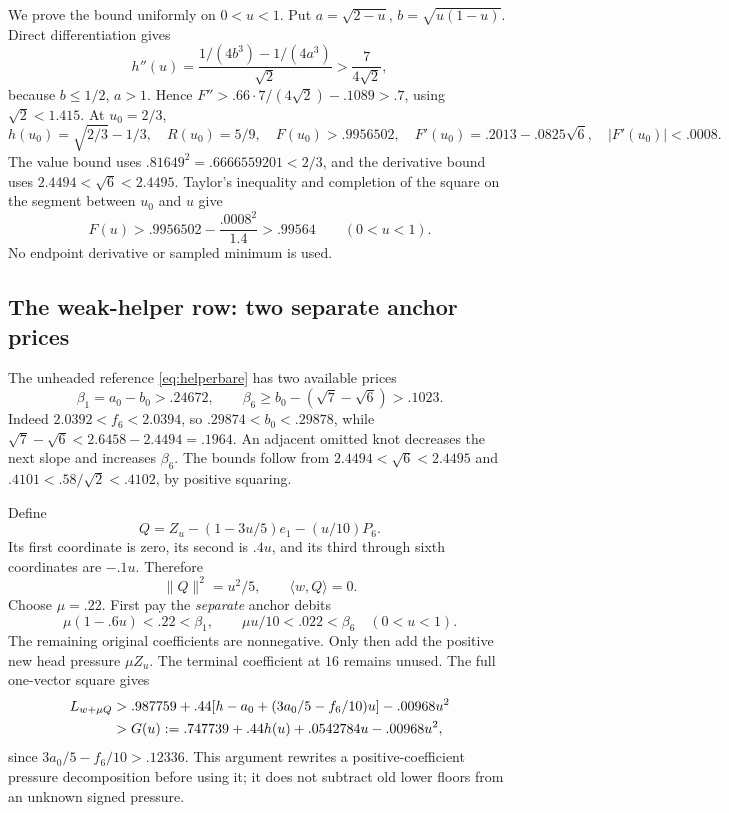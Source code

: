 \documentclass[11pt]{article}
\theoremstyle{definition}
\theoremstyle{remark}
\newcommand{\ip}[2]{\langle #1,#2\rangle}
\newcommand{\norm}[1]{\lVert #1\rVert}
\begin{document}
We prove the bound uniformly on \(0<u<1\). Put
\(a=\sqrt{2-u}\), \(b=\sqrt{u(1-u)}\). Direct differentiation gives
\begin{equation}
\label{eq:hcurvature}
 h''(u)=\frac{1/(4b^3)-1/(4a^3)}{\sqrt2}
        >\frac7{4\sqrt2},
\end{equation}
because \(b\leq1/2\), \(a>1\). Hence
\(F''>.66\cdot7/(4\sqrt2)-.1089>.7\), using \(\sqrt2<1.415\).
At \(u_0=2/3\),
\[
 h(u_0)=\sqrt{2/3}-1/3,\quad R(u_0)=5/9,\quad
 F(u_0)>.9956502,\quad
 F'(u_0)=.2013-.0825\sqrt6,\quad |F'(u_0)|<.0008.
\]
The value bound uses
\(.81649^2=.6666559201<2/3\), and the derivative bound uses
\(2.4494<\sqrt6<2.4495\). Taylor's inequality and completion
of the square on the segment between \(u_0\) and \(u\) give
\begin{equation}
\label{eq:Fseal}
 F(u)>.9956502-\frac{.0008^2}{1.4}>.99564
 \qquad(0<u<1).
\end{equation}
No endpoint derivative or sampled minimum is used.

\subsection{The weak-helper row: two separate anchor prices}
\label{subsec:helperfunding}
The unheaded reference \eqref{eq:helperbare} has two available
prices
\begin{equation}
\label{eq:twoprices}
 \beta_1=a_0-b_0>.24672,\qquad
 \beta_6\geq b_0-(\sqrt7-\sqrt6)>.1023.
\end{equation}
Indeed \(2.0392<f_6<2.0394\), so
\(.29874<b_0<.29878\), while
\(\sqrt7-\sqrt6<2.6458-2.4494=.1964\).
An adjacent omitted knot decreases the next slope and increases
\(\beta_6\). The bounds follow from
\(2.4494<\sqrt6<2.4495\) and
\(.4101<.58/\sqrt2<.4102\), by positive squaring.

Define
\[
 Q=Z_u-(1-3u/5)e_1-(u/10)P_6.
\]
Its first coordinate is zero, its second is \(.4u\), and its
third through sixth coordinates are \(-.1u\). Therefore
\begin{equation}
\label{eq:helperresidual}
 \norm{Q}^2=u^2/5,\qquad \ip{w}{Q}=0.
\end{equation}
Choose \(\mu=.22\). First pay the \emph{separate} anchor debits
\[
 \mu(1-.6u)<.22<\beta_1,\qquad
 \mu u/10<.022<\beta_6
 \quad(0<u<1).
\]
The remaining original coefficients are nonnegative. Only then
add the positive new head pressure \(\mu Z_u\).
The terminal coefficient at \(16\) remains unused. The full
one-vector square gives
\begin{align}
\label{eq:Gdefinition}
 L_{w+\mu Q}
 &>.987759+.44[h-a_0+(3a_0/5-f_6/10)u]-.00968u^2\notag\\
 &>G(u):=.747739+.44h(u)+.0542784u-.00968u^2,
\end{align}
since \(3a_0/5-f_6/10>.12336\).
This argument rewrites a positive-coefficient pressure
decomposition before using it; it does not subtract old lower
floors from an unknown signed pressure.
\end{document}

